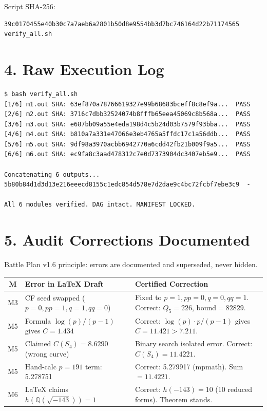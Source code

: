 \documentclass[11pt,letterpaper]{article}
\begin{document}
Script SHA-256:
\begin{lstlisting}
39c0170455e40b30c7a7aeb6a2801b50d8e9554bb3d7bc746164d22b71174565  verify_all.sh
\end{lstlisting}

\section*{4. Raw Execution Log}

\begin{lstlisting}
$ bash verify_all.sh
[1/6] m1.out SHA: 63ef870a78766619327e99b68683bceff8c8ef9a...  PASS
[2/6] m2.out SHA: 3716c7dbb32524074b8fffb65eea45069c8b568a...  PASS
[3/6] m3.out SHA: e687bb09a55e4eda198d4c5b24d03b7579f93bba...  PASS
[4/6] m4.out SHA: b810a7a331e47066e3eb4765a5ffdc17c1a56ddb...  PASS
[5/6] m5.out SHA: 9df98a3970acbb6942770a6cdd42fb21b009f9a5...  PASS
[6/6] m6.out SHA: ec9fa8c3aad478312c7e0d7373904dc3407eb5e9...  PASS

Concatenating 6 outputs...
5b80b84d1d3d13e216eeecd8155c1edc854d578e7d2dae9c4bc72fcbf7ebe3c9  -

All 6 modules verified. DAG intact. MANIFEST LOCKED.
\end{lstlisting}

\section*{5. Audit Corrections Documented}

Battle Plan v1.6 principle: errors are documented and superseded, never hidden.

\begin{center}
\begin{tabular}{|c|p{4.5cm}|p{5cm}|}
\hline
\textbf{M} & \textbf{Error in LaTeX Draft} & \textbf{Certified Correction} \\
\hline
M3 & CF seed swapped ($p=0,pp=1,q=1,qq=0$)
   & Fixed to $p=1,pp=0,q=0,qq=1$. Correct: $Q_5=226$, bound$=82829$. \\
\hline
M5 & Formula $\log(p)/(p-1)$ gives $C=1.434$
   & Correct: $\log(p) \cdot p/(p-1)$ gives $C=11.421 > 7.211$. \\
\hline
M5 & Claimed $C(S_4)=8.6290$ (wrong curve)
   & Binary search isolated error. Correct: $C(S_4)=11.4221$. \\
\hline
M5 & Hand-calc $p=191$ term: 5.278751
   & Correct: 5.279917 (mpmath). Sum $= 11.4221$. \\
\hline
M6 & LaTeX claims $h(\mathbb{Q}(\sqrt{-143}))=1$
   & Correct: $h(-143)=10$ (10 reduced forms). Theorem stands. \\
\hline
\end{tabular}
\end{center}
\end{document}
